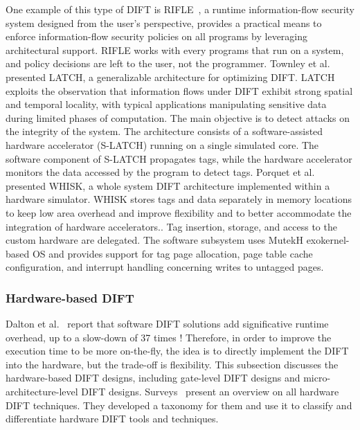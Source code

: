 One example of this type of DIFT is RIFLE~\cite{VBCROBRVA-04-micro}, a runtime information-flow security system designed from the user's perspective, provides a practical means to enforce information-flow security policies on all programs by leveraging architectural support. RIFLE works with every programs that run on a system, and policy decisions are left to the user, not the programmer.
Townley et al.~\cite{TKPAY-19-micro} presented LATCH, a generalizable architecture for optimizing DIFT. 
LATCH exploits the observation that information flows under DIFT exhibit strong spatial and temporal locality, with typical applications manipulating sensitive data during limited phases of computation. The main objective is to detect attacks on the integrity of the system. The architecture consists of a software-assisted hardware accelerator (S-LATCH) running on a single simulated core. The software component of S-LATCH propagates tags, while the hardware accelerator monitors the data accessed by the program to detect tags. 
Porquet et al.~\cite{PS-13-codes} presented WHISK, a whole system DIFT architecture implemented within a hardware simulator. WHISK stores tags and data separately in memory locations to keep low area overhead and improve flexibility and to better accommodate the integration of hardware accelerators.. Tag insertion, storage, and access to the custom hardware are delegated. The software subsystem uses MutekH exokernel-based OS and provides support for tag page allocation, page table cache configuration, and interrupt handling concerning writes to untagged pages.


\subsubsection{Hardware-based DIFT}
Dalton et al.~\cite{DKK-07-sigarch} report that software DIFT solutions add significative runtime overhead, up to a slow-down of 37 times ! Therefore, in order to improve the execution time to be more on-the-fly, the idea is to directly implement the DIFT into the hardware, but the trade-off is flexibility.
This subsection discusses the hardware-based DIFT designs, including gate-level DIFT designs and micro-architecture-level DIFT designs. Surveys~\cite{HAK-21-acmcsur,BSMCVEJCO-21-acmcsur} present an overview on all hardware DIFT techniques. They developed a taxonomy for them and use it to classify and differentiate hardware DIFT tools and techniques.

